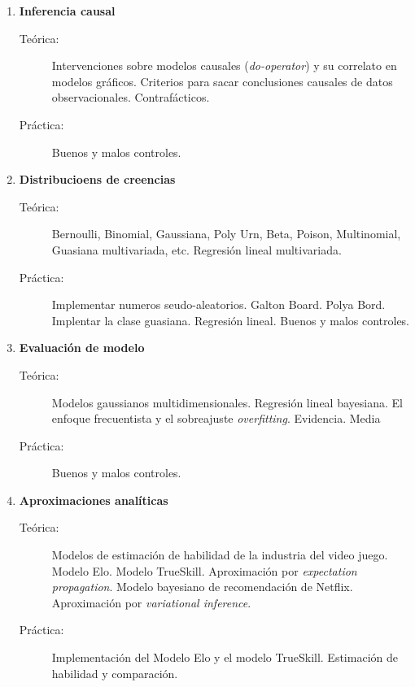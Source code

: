 \documentclass[10pt]{article}
\begin{document}
\begin{enumerate}

\vspace{0.1cm}
\item \textbf{Inferencia causal}
\vspace{-0.15cm}
\begin{description}
\item[Teórica:] Intervenciones sobre modelos causales (\emph{do-operator}) y su correlato en modelos gráficos. Criterios para sacar conclusiones causales de datos observacionales. Contrafácticos. 
\item[Práctica:] Buenos y malos controles.
\end{description}


\vspace{0.1cm}
\item \textbf{Distribucioens de creencias}
\vspace{-0.15cm}
\begin{description}
\item[Teórica:] Bernoulli, Binomial, Gaussiana, Poly Urn, Beta, Poison, Multinomial, Guasiana multivariada, etc. Regresión lineal multivariada.
\item[Práctica:] Implementar numeros seudo-aleatorios. Galton Board. Polya Bord. Implentar la clase guasiana. Regresión lineal. Buenos y malos controles.
\end{description}


\vspace{0.1cm}
\item \textbf{Evaluación de modelo}
\vspace{-0.15cm}
\begin{description}
\item[Teórica:] Modelos gaussianos multidimensionales. Regresión lineal bayesiana. El enfoque frecuentista y el sobreajuste \emph{overfitting}. Evidencia. Media 
\item[Práctica:] Buenos y malos controles.
\end{description}


\vspace{0.1cm}
\item \textbf{Aproximaciones analíticas}
\vspace{-0.15cm}
\begin{description}
\item[Teórica:] Modelos de estimación de habilidad de la industria del video juego. Modelo Elo. Modelo TrueSkill. Aproximación por \emph{expectation propagation}. Modelo bayesiano de recomendación de Netflix. Aproximación por \emph{variational inference}.
\item[Práctica:] Implementación del Modelo Elo y el modelo TrueSkill. Estimación de habilidad y comparación.
\end{description}


\end{enumerate}
\end{document}
